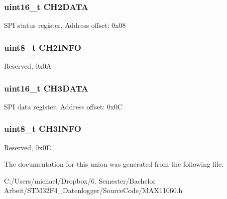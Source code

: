 \subsubsection[{C\+H2\+D\+A\+T\+A}]{\setlength{\rightskip}{0pt plus 5cm}uint16\+\_\+t C\+H2\+D\+A\+T\+A}\label{union_m_a_x11060___a_d_c___d_a_t_a__t_aad21a92fdd0012488a50bee6e010debb}
S\+P\+I status register, Address offset\+: 0x08 \hypertarget{union_m_a_x11060___a_d_c___d_a_t_a__t_aa17517e035c3bdf5ecc423175a33d648}{}
\subsubsection[{C\+H2\+I\+N\+F\+O}]{\setlength{\rightskip}{0pt plus 5cm}uint8\+\_\+t C\+H2\+I\+N\+F\+O}\label{union_m_a_x11060___a_d_c___d_a_t_a__t_aa17517e035c3bdf5ecc423175a33d648}
Reserved, 0x0\+A \hypertarget{union_m_a_x11060___a_d_c___d_a_t_a__t_adbe299473aad31895b9e68ad4eaefaf0}{}
\subsubsection[{C\+H3\+D\+A\+T\+A}]{\setlength{\rightskip}{0pt plus 5cm}uint16\+\_\+t C\+H3\+D\+A\+T\+A}\label{union_m_a_x11060___a_d_c___d_a_t_a__t_adbe299473aad31895b9e68ad4eaefaf0}
S\+P\+I data register, Address offset\+: 0x0\+C \hypertarget{union_m_a_x11060___a_d_c___d_a_t_a__t_a382d2737c0b6b44464acd263161fb41f}{}
\subsubsection[{C\+H3\+I\+N\+F\+O}]{\setlength{\rightskip}{0pt plus 5cm}uint8\+\_\+t C\+H3\+I\+N\+F\+O}\label{union_m_a_x11060___a_d_c___d_a_t_a__t_a382d2737c0b6b44464acd263161fb41f}
Reserved, 0x0\+E 

The documentation for this union was generated from the following file\+:\begin{DoxyCompactItemize}
\item 
C\+:/\+Users/michael/\+Dropbox/6. Semester/\+Bachelor Arbeit/\+S\+T\+M32\+F4\+\_\+\+Datenlogger/\+Source\+Code/M\+A\+X11060.\+h\end{DoxyCompactItemize}
